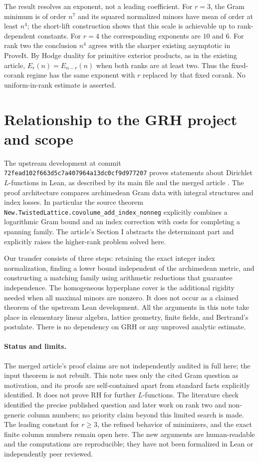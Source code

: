 \documentclass[11pt]{article}
\theoremstyle{remark}\newtheorem{remark}[theorem]{Remark}
\begin{document}
The result resolves an exponent, not a leading coefficient. For $r=3$, the Gram minimum is of order $n^7$ and its squared normalized minors have mean of order at least $n^4$; the short-lift construction shows that this scale is achievable up to rank-dependent constants. For $r=4$ the corresponding exponents are $10$ and $6$. For rank two the conclusion $n^4$ agrees with the sharper existing asymptotic in ProveIt. By Hodge duality for primitive exterior products, as in the existing article, $E_r(n)=E_{n-r}(n)$ when both ranks are at least two. Thus the fixed-corank regime has the same exponent with $r$ replaced by that fixed corank. No uniform-in-rank estimate is asserted.

\section{Relationship to the GRH project and scope}
The upstream development at commit \texttt{72fead102f663d5c7a407964a13dc0cf9d977207} proves statements about Dirichlet $L$-functions in Lean, as described by its main file and the merged article \cite{upstream,proveit}. The proof architecture compares archimedean Gram data with integral structures and index losses. In particular the source theorem \texttt{New.TwistedLattice.covolume\_add\_index\_nonneg} explicitly combines a logarithmic Gram bound and an index correction with costs for completing a spanning family. The article's Section I abstracts the determinant part and explicitly raises the higher-rank problem solved here.

Our transfer consists of three steps: retaining the exact integer index normalization, finding a lower bound independent of the archimedean metric, and constructing a matching family using arithmetic reductions that guarantee independence. The homogeneous hyperplane cover is the additional rigidity needed when all maximal minors are nonzero. It does not occur as a claimed theorem of the upstream Lean development. All the arguments in this note take place in elementary linear algebra, lattice geometry, finite fields, and Bertrand's postulate. There is no dependency on GRH or any unproved analytic estimate.

\paragraph{Status and limits.} The merged article's proof claims are not independently audited in full here; the input theorem is not rebuilt. This note uses only the cited Gram question as motivation, and its proofs are self-contained apart from standard facts explicitly identified. It does not prove RH for further $L$-functions. The literature check identified the precise published question and later work on rank two and non-generic column numbers; no priority claim beyond this limited search is made. The leading constant for $r\ge3$, the refined behavior of minimizers, and the exact finite column numbers remain open here. The new arguments are human-readable and the computations are reproducible; they have not been formalized in Lean or independently peer reviewed.
\end{document}
